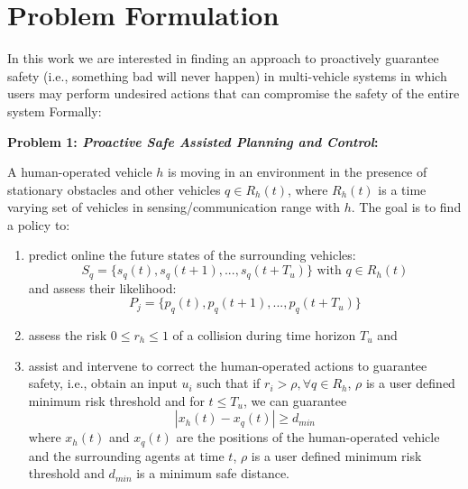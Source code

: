 \documentclass[conference]{IEEEtran}
\begin{document}
    
    
\section{Problem Formulation}
 
In this work we are interested in finding an approach to proactively guarantee safety (i.e., something bad will never happen) in multi-vehicle systems in which users may perform undesired actions that can compromise the safety of the entire system Formally: 

\textbf{Problem 1: \textit{Proactive Safe Assisted Planning and Control}:} 
    
    A human-operated vehicle $h$ is moving in an environment in the presence of stationary obstacles and other vehicles $q \in R_h(t)$, where $R_h(t)$ is a time varying set of vehicles in sensing/communication range with $h$. The goal is to find a policy to:
    \begin{enumerate}
        \item  predict online the future states of the surrounding vehicles:
    \begin{equation}
    S_q=\{{s_q(t), s_q(t+1),..., s_q(t+T_u)}\} \text{ with } q \in R_h(t)
    \end{equation}
    and assess their likelihood:
    \begin{equation}
    P_j=\{{p_q(t), p_q(t+1),..., p_q(t+T_u)}\}
    \end{equation}
    \item assess the risk $0\leq r_h \leq1$ of a collision during time horizon $T_u$ and
    \item assist and intervene to correct the human-operated actions to guarantee safety, i.e., obtain an input $u_i$ such that if $r_i>\rho, \forall q \in R_h$, $\rho$ is a user defined minimum risk threshold and for $t\leq T_u$, we can guarantee
    \begin{equation}
        |x_h(t)-x_q(t)| \geq d_{min}
    \end{equation}
     where $x_h(t)$ and $x_q(t)$ are the positions of the human-operated vehicle and the surrounding agents at time $t$, $\rho$ is a user defined minimum risk threshold and $d_{min}$ is a minimum safe distance.
    \end{enumerate}
    
\end{document}
